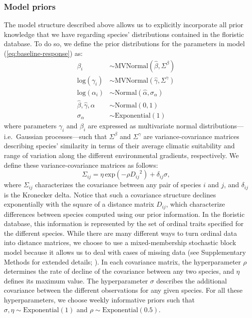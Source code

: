 \documentclass[11pt, a4paper]{article}
\begin{document}
\subsubsection*{Model priors}
The model structure described above allows us to explicitly incorporate all prior knowledge that we have regarding species' distributions contained in the floristic database. To do so, we define the prior distributions for the parameters in model (\ref{eq:baseline-response}) as:
\begin{equation} 
\begin{split}
\beta_{i}  & \sim \text{MVNormal}\left(\hat{\beta}, \Sigma^{\beta}\right)\\
\text{log}(\gamma_{i})  & \sim \text{MVNormal}\left(\hat{\gamma}, \Sigma^{\gamma}\right)\\
\text{log}(\alpha_{i}) & \sim \text{Normal}\left(\hat{\alpha}, \sigma_{\alpha}\right)\\
\hat{\beta}, 
\hat{\gamma}, 
\hat{\alpha}  & \sim \text{Normal}\left(0,1\right)\\
\sigma_{\alpha}  & \sim \text{Exponential}\left(1\right)
\end{split}
\label{eq:baseline-priors}
\end{equation} 
where parameters $\gamma_i$ and $\beta_i$ are expressed as multivariate normal distributions---i.e.~Gaussian processes---such that $\Sigma^{\beta}$ and $\Sigma^{\gamma}$ are variance-covariance matrices describing species' similarity in terms of their average climatic suitability and range of variation along the different environmental gradients, respectively. We define these variance-covariance matrices as follows:
\begin{equation} 
\Sigma_{ij} = \eta\,\text{exp}\left(-\rho {D_{ij}}^2\right) + \delta_{ij} \sigma ,
\label{eq:covariance-baseline}
\end{equation}
where $\Sigma_{ij}$ characterizes the covariance between any pair of species $i$ and $j$, and $\delta_{ij}$ is the Kronecker delta. Notice that such a covariance structure declines exponentially with the square of a distance matrix $D_{ij}$, which characterize differences between species computed using our prior information. In the floristic database, this information is represented by the set of ordinal traits specified for the different species. While there are many different ways to turn ordinal data into distance matrices, we choose to use a mixed-membership stochastic block model because it allows us to deal with cases of missing data (see Supplementary Methods for extended details; \citealt{godoy-loriteAccurateScalableSocial2016}). In each covariance matrix, the hyperparameter $\rho$ determines the rate of decline of the covariance between any two species, and $\eta$ defines its maximum value. The hyperparameter $\sigma$ describes the additional covariance between the different observations for any given species. For all these hyperparameters, we choose weekly informative priors such that $\sigma , \eta \sim \text{Exponential}\left(1\right)$ and $\rho\sim \text{Exponential}\left(0.5\right)$.
\end{document}
